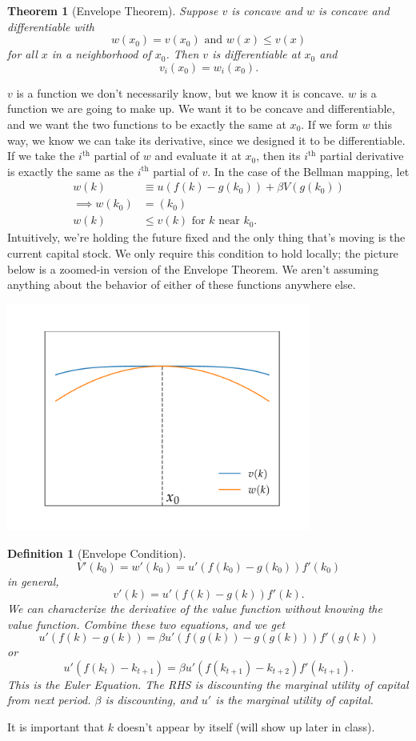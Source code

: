 \documentclass[11pt]{article}
\newtheorem*{definition}{Definition}
\newtheorem*{theorem}{Theorem}
\begin{document}
\begin{theorem}[Envelope Theorem]
Suppose $v$ is concave and $w$ is concave and differentiable with
\[
w(x_0) = v(x_0) \text{ and } w(x) \le v(x)
\]
for all $x$ in a neighborhood of $x_0$. Then $v$ is differentiable at $x_0$ and
\[
v_i (x_0) = w_i (x_0).
\]
\end{theorem}
\(v\) is a function we don't necessarily know, but we know it is concave. \(w\) is a function we are going to make up. We want it to be concave and differentiable, and we want the two functions to be exactly the same at \(x_0\). If we form \(w\) this way, we know we can take its derivative, since we designed it to be differentiable. If we take the \(i^{\text{th}}\) partial of \(w\) and evaluate it at \(x_0\), then its \(i^{\text{th}}\) partial derivative is exactly the same as the \(i^{\text{th}}\) partial of \(v\). In the case of the Bellman mapping, let
\begin{align*}
w(k) &\equiv u(f(k) - g(k_0)) + \beta V(g(k_0))\\
\implies w(k_0) &= (k_0)\\
w(k) &\le v(k) \text{ for } k \text{ near } k_0.
\end{align*}
Intuitively, we're holding the future fixed and the only thing that's moving is the current capital stock. We only require this condition to hold locally; the picture below is a zoomed-in version of the Envelope Theorem. We aren't assuming anything about the behavior of either of these functions anywhere else.

\begin{center}
\includegraphics[width=0.75\textwidth, keepaspectratio=true]{figures/envelope_theorem.pdf}
\end{center}

\begin{definition}[Envelope Condition]
\[
V'(k_0) = w'(k_0) = u'(f(k_0) - g(k_0))f'(k_0) \tag{chain rule}
\]
in general,
\[
v'(k) = u'(f(k) - g(k))f'(k).
\]
We can characterize the derivative of the value function without knowing the value function. Combine these two equations, and we get
\[
u'(f(k) - g(k)) = \beta u'(f(g(k)) - g(g(k)))f'(g(k))
\]
or
\[
u'(f(k_t) - k_{t + 1}) = \beta u'(f(k_{t + 1}) - k_{t + 2})f'(k_{t + 1}). 
\]
This is the Euler Equation. The RHS is discounting the marginal utility of capital from next period. $\beta$ is discounting, and $u'$ is the marginal utility of capital.
\end{definition}
It is important that \(k\) doesn't appear by itself (will show up later in class).
\end{document}
